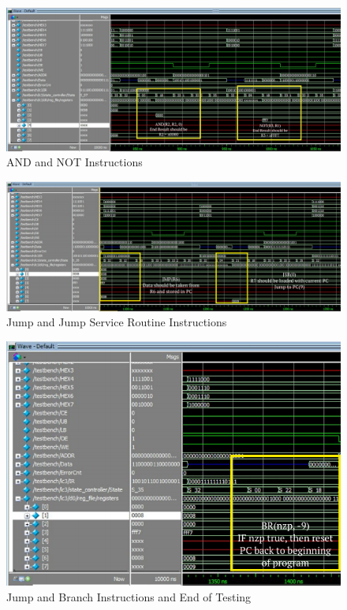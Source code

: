 \documentclass[journal, twocolumn, final,11pt,letterpaper]{IEEEtran}
\begin{document}
\begin{figure} [htbp]
	\centering
	\includegraphics[scale=0.7]{AND_NOT.png}
	\caption{AND and NOT Instructions\label{fig:ISDU-circuit}}
\end{figure}

\begin{figure} [htbp]
	\centering
	\includegraphics[scale=0.3]{JMP_JSR.png}
	\caption{Jump and Jump Service Routine Instructions\label{fig:ISDU-circuit}}
\end{figure}

\begin{figure} [htbp]
	\centering
	\includegraphics[scale=0.7]{JSR_BR_after.png}
	\caption{Jump and Branch Instructions and End of Testing\label{fig:ISDU-circuit}}
\end{figure}
\end{document}
